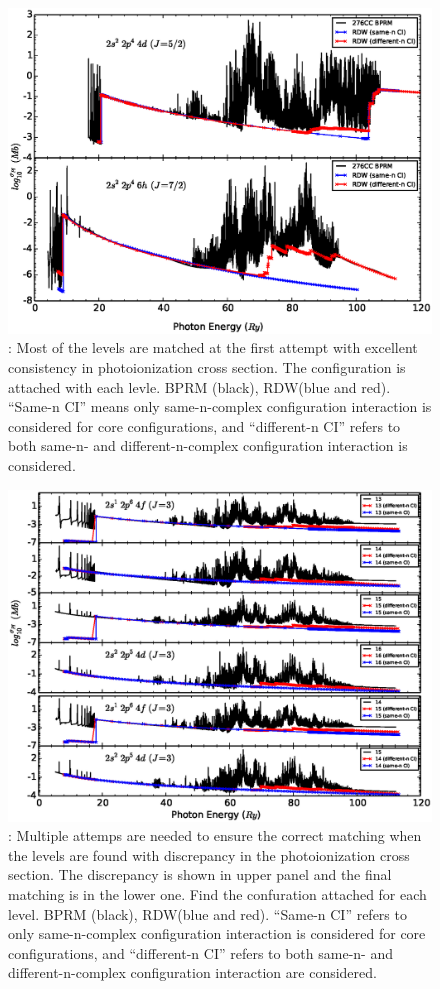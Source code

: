 \begin{figure}
	\centering
	\includegraphics[width=.9\textwidth]{figures/fe18_bprm_fac.eps}
	\caption{: Most of the levels are matched at the first attempt with excellent consistency in photoionization cross section. The configuration is attached with each levle. BPRM (black), RDW(blue and red). ``Same-n CI'' means only same-n-complex configuration interaction is considered for core configurations, and ``different-n CI'' refers to both same-n- and different-n-complex configuration interaction is considered.}
	\label{fe18_bprm_fac}
\end{figure}

\begin{figure}
	\centering
	\includegraphics[width=.9\textwidth]{figures/fe17_howtomatch.eps}
	\caption{: Multiple attemps are needed to ensure the correct matching when the levels are found with discrepancy in the photoionization cross section. The discrepancy is shown in upper panel and the final matching is in the lower one. Find the confuration attached for each level. BPRM (black), RDW(blue and red). ``Same-n CI'' refers to only same-n-complex configuration interaction is considered for core configurations, and ``different-n CI'' refers to both same-n- and different-n-complex configuration interaction are considered.}
	\label{fe17_howtomatch}
\end{figure}

